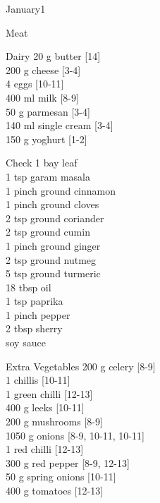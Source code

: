 \begin{menu}{January1}
\begin{shoppinglist}{Meat}
      \end{shoppinglist}%
      \begin{shoppinglist}{Dairy}
      20 g butter {\scriptsize[14]}\\
      200 g cheese {\scriptsize[3-4]}\\
      4  eggs {\scriptsize[10-11]}\\
      400 ml milk {\scriptsize[8-9]}\\
      50 g parmesan {\scriptsize[3-4]}\\
      140 ml single cream {\scriptsize[3-4]}\\
      150 g yoghurt {\scriptsize[1-2]}\\
      \end{shoppinglist}%
      \par\vfil %
      \vfil\clearpage %
      \begin{shoppinglist}{Check}
      1  bay leaf \\
      1 tsp garam masala \\
      1 pinch ground cinnamon \\
      1 pinch ground cloves \\
      2 tsp ground coriander \\
      2 tsp ground cumin \\
      1 pinch ground ginger \\
      2 tsp ground nutmeg \\
      5 tsp ground turmeric \\
      18 tbsp oil \\
      1 tsp paprika \\
      1 pinch pepper \\
      2 tbsp sherry \\
       soy sauce \\
      \end{shoppinglist}%
      \begin{shoppinglist}{Extra Vegetables}
      200 g celery {\scriptsize[8-9]}\\
      1  chillis {\scriptsize[10-11]}\\
      1  green chilli {\scriptsize[12-13]}\\
      400 g leeks {\scriptsize[10-11]}\\
      200 g mushrooms {\scriptsize[8-9]}\\
      1050 g onions {\scriptsize[8-9, 10-11, 10-11]}\\
      1  red chilli {\scriptsize[12-13]}\\
      300 g red pepper {\scriptsize[8-9, 12-13]}\\
      50 g spring onions {\scriptsize[10-11]}\\
      400 g tomatoes {\scriptsize[12-13]}\\
      \end{shoppinglist}%
      \par\vfil %
    \vfil\clearpage
  

\end{menu}

